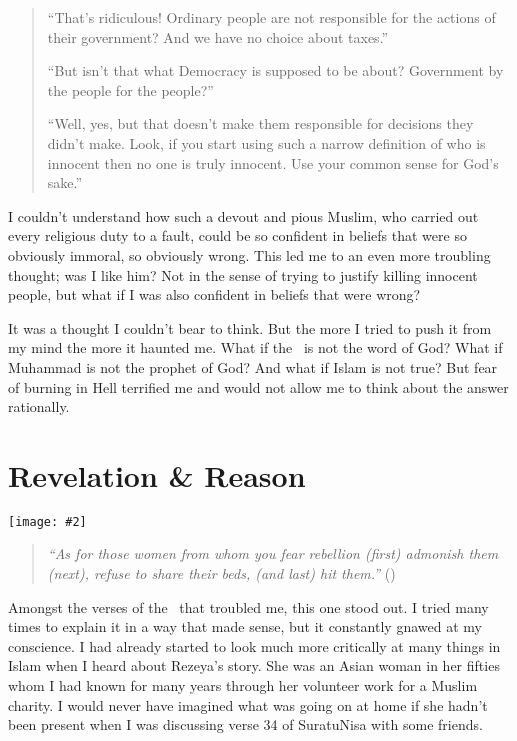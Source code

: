 \documentclass[12pt]{memoir}
\newcommand{\img}[3]{\begin{center}%
\texttt{[image: \#2]}\\{\small\em#3}%
\end{center}}
\begin{document}
\begin{quote}
“That’s ridiculous! Ordinary people are not responsible
for the actions of their government?
And we have no choice about taxes.”

“But isn’t that what Democracy is supposed to be about?
Government by the people for the people?”

“Well, yes, but that doesn’t make them responsible
for decisions they didn’t make.
Look, if you start using such a narrow definition
of who is innocent then no one is truly innocent.
Use your common sense for God’s sake.”
\end{quote}

I couldn’t understand how such a devout and pious Muslim,
who carried out every religious duty to a fault,
could be so confident in beliefs that were so obviously immoral,
so obviously wrong.
This led me to an even more troubling thought; was I like him?
Not in the sense of trying to justify killing innocent people,
but what if I was also confident in beliefs that were wrong?

It was a thought I couldn’t bear to think.
But the more I tried to push it from my mind the more it haunted me.
What if the \Quran\ is not the word of God?
What if Muhammad is not the prophet of God?
And what if Islam is not true?
But fear of burning in Hell terrified me
and would not allow me to think about the answer rationally.


\chapter{Revelation \& Reason}

\img{scale=0.6}{Man_Reading_Koran.jpg}{}

\begin{quote}
\emph{“As for those women from whom you fear rebellion (first)
admonish them (next), refuse to share their beds, (and last) hit them.”}
()
\end{quote}

Amongst the verses of the \Quran\ that troubled me, this one stood out.
I tried many times to explain it in a way that made sense,
but it constantly gnawed at my conscience.
I had already started to look much more critically
at many things in Islam when I heard about Rezeya’s story.
She was an Asian woman in her fifties whom I had known
for many years through her volunteer work for a Muslim charity.
I would never have imagined what was going on at home
if she hadn’t been present when I was discussing
verse 34 of Suratu\–Nisa with some friends.
\end{document}
